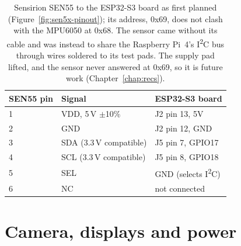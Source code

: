 \begin{table}[htbp]
\centering
\caption[Sensirion SEN55 to the ESP32-S3 board as first planned (Figure~\ref{fig:sen5x-pinout}); its address, 0x69, does not clash with the MPU6050 at 0x68]{Sensirion SEN55 to the ESP32-S3 board as first planned (Figure~\ref{fig:sen5x-pinout}); its address, 0x69, does not clash with the MPU6050 at 0x68. The sensor came without its cable and was instead to share the Raspberry Pi~4's I\textsuperscript{2}C bus through wires soldered to its test pads. The supply pad lifted, and the sensor never answered at 0x69, so it is future work (Chapter~\ref{chap:recs}).}
\label{tab:wiring-sen55}
\begin{tabular}{|l|l|l|}
\hline
\textbf{SEN55 pin} & \textbf{Signal} & \textbf{ESP32-S3 board} \\ \hline
1 & VDD, 5\,V $\pm$10\% & J2 pin 13, 5V \\ \hline
2 & GND & J2 pin 12, GND \\ \hline
3 & SDA (3.3\,V compatible) & J5 pin 7, GPIO17 \\ \hline
4 & SCL (3.3\,V compatible) & J5 pin 8, GPIO18 \\ \hline
5 & SEL & GND (selects I\textsuperscript{2}C) \\ \hline
6 & NC & not connected \\ \hline
\end{tabular}
\end{table}

\clearpage
\section{Camera, displays and power}

